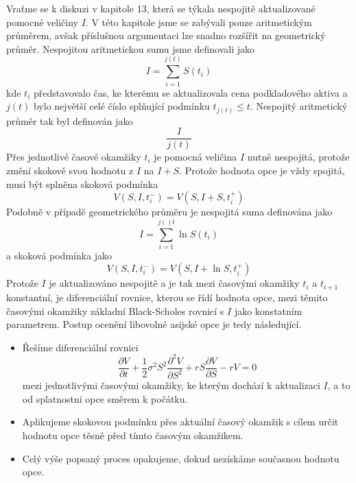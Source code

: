 \documentclass[a4paper]{book}
\begin{document}
Vraťme se k diskuzi v kapitole 13, která se týkala nespojitě aktualizované pomocné veličiny $I$. V této kapitole jsme se zabývali pouze aritmetickým průměrem, avšak příslušnou argumentaci lze snadno rozšířit na geometrický průměr. Nespojitou aritmetickou sumu jsme definovali jako
\begin{equation*}
I = \sum_{i=1}^{j(t)}S(t_i)
\end{equation*}
kde $t_i$ představovalo čas, ke kterému se aktualizovala cena podkladového aktiva a $j(t)$ bylo největší celé číslo splňující podmínku $t_{j(t)} \le t$. Nespojitý aritmetický průměr tak byl definován jako
\begin{equation*}
\frac{I}{j(t)}
\end{equation*}
Přes jednotlivé časové okamžiky $t_i$ je pomocná veličina $I$ nutně nespojitá, protože změní skokově svou hodnotu z $I$ na $I + S$. Protože hodnota opce je vždy spojitá, musí být splněna skoková podmínka
\begin{equation*}
V(S, I, t_i^{-}) = V(S, I + S, t_i^{+})
\end{equation*}
Podobně v případě geometrického průměru je nespojitá suma definována jako
\begin{equation*}
I = \sum_{i = 1}^{j()t} \ln S(t_i)
\end{equation*}
a skoková podmínka jako
\begin{equation*}
V(S, I, t_i^{-}) = V(S, I + \ln S, t_i^{+})
\end{equation*}
Protože $I$ je aktualizováno nespojitě a je tak mezi časovými okamžiky $t_i$ a $t_{i + 1}$ konstantní, je diferenciální rovnice, kterou se řídí hodnota opce, mezi těmito časovými okamžiky základní Black-Scholes rovnicí s $I$ jako konstatním parametrem. Postup ocenění libovolné asijské opce je tedy následující.
\begin{itemize}
\item Řešíme diferenciální rovnici
\begin{equation*}
\frac{\partial V}{\partial t} + \frac{1}{2} \sigma^2 S^2 \frac{\partial^2 V}{\partial S^2} + r S \frac{\partial V}{\partial S} - rV = 0
\end{equation*}
mezi jednotlivými časovými okamžiky, ke kterým dochází k aktualizaci $I$, a to od splatnostni opce směrem k počátku.
\item Aplikujeme skokovou podmínku přes aktuální časový okamžik s cílem určit hodnotu opce těsně před tímto časovým okamžikem.
\item Celý výše popsaný proces opakujeme, dokud nezískáme současnou hodnotu opce.
\end{itemize}
\end{document}
